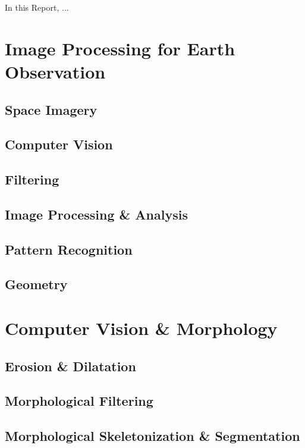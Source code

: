 
In this Report, ...


\section{Image Processing for Earth Observation}

\subsection{Space Imagery}

\subsection{Computer Vision}

\subsection{Filtering}

\subsection{Image Processing \& Analysis}

\subsection{Pattern Recognition}

\subsection{Geometry}


\section{Computer Vision \& Morphology}

\subsection{Erosion \& Dilatation}

\subsection{Morphological Filtering}

\subsection{Morphological Skeletonization \& Segmentation}


